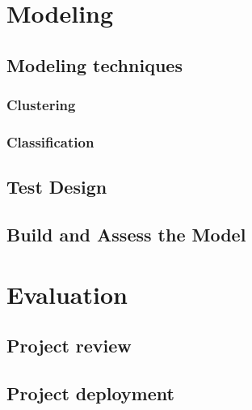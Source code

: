 \section*{Modeling}

\subsection*{Modeling techniques}
\subsubsection*{Clustering}

\subsubsection*{Classification}

\subsection*{Test Design}

\subsection*{Build and Assess the Model}


\section*{Evaluation}


\subsection*{Project review}

\subsection*{Project deployment}


